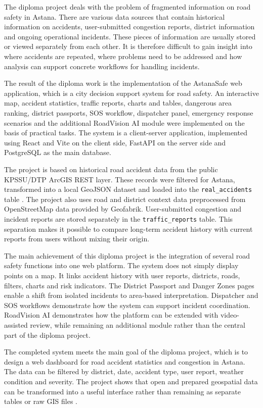 ﻿\documentclass[12pt,a4paper]{report}
\begin{document}
The diploma project deals with the problem of fragmented information on road safety in Astana. There are various data sources that contain historical information on accidents, user-submitted congestion reports, district information and ongoing operational incidents. These pieces of information are usually stored or viewed separately from each other. It is therefore difficult to gain insight into where accidents are repeated, where problems need to be addressed and how analysis can support concrete workflows for handling incidents.

The result of the diploma work is the implementation of the AstanaSafe web application, which is a city decision support system for road safety. An interactive map, accident statistics, traffic reports, charts and tables, dangerous area ranking, district passports, SOS workflow, dispatcher panel, emergency response scenarios and the additional RoadVision AI module were implemented on the basis of practical tasks. The system is a client-server application, implemented using React and Vite on the client side, FastAPI on the server side and PostgreSQL as the main database.

The project is based on historical road accident data from the public KPSSU/DTP ArcGIS REST layer. These records were filtered for Astana, transformed into a local GeoJSON dataset and loaded into the \texttt{real\_accidents} table \cite{kpssuDtp}. The project also uses road and district context data preprocessed from OpenStreetMap data provided by Geofabrik. User-submitted congestion and incident reports are stored separately in the \texttt{traffic\_reports} table. This separation makes it possible to compare long-term accident history with current reports from users without mixing their origin.

The main achievement of this diploma project is the integration of several road safety functions into one web platform. The system does not simply display points on a map. It links accident history with user reports, districts, roads, filters, charts and risk indicators. The District Passport and Danger Zones pages enable a shift from isolated incidents to area-based interpretation. Dispatcher and SOS workflows demonstrate how the system can support incident coordination. RoadVision AI demonstrates how the platform can be extended with video-assisted review, while remaining an additional module rather than the central part of the diploma project.

The completed system meets the main goal of the diploma project, which is to design a web dashboard for road accident statistics and congestion in Astana. The data can be filtered by district, date, accident type, user report, weather condition and severity. The project shows that open and prepared geospatial data can be transformed into a useful interface rather than remaining as separate tables or raw GIS files \cite{goodchild2007}.
\end{document}
